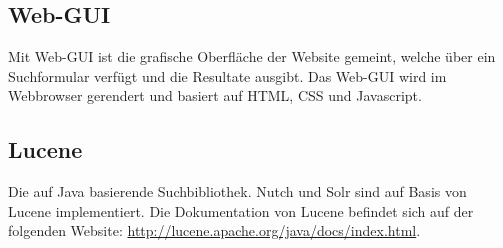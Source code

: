 \subsection*{Web-GUI}
Mit Web-GUI ist die grafische Oberfläche der Website gemeint, welche über ein Suchformular verfügt und die Resultate ausgibt. Das Web-GUI wird im Webbrowser gerendert und basiert auf HTML, CSS und Javascript.

\subsection*{Lucene}
Die auf Java basierende Suchbibliothek. Nutch und Solr sind auf Basis von Lucene implementiert. Die Dokumentation von Lucene befindet sich auf der folgenden Website:
\url{http://lucene.apache.org/java/docs/index.html}.